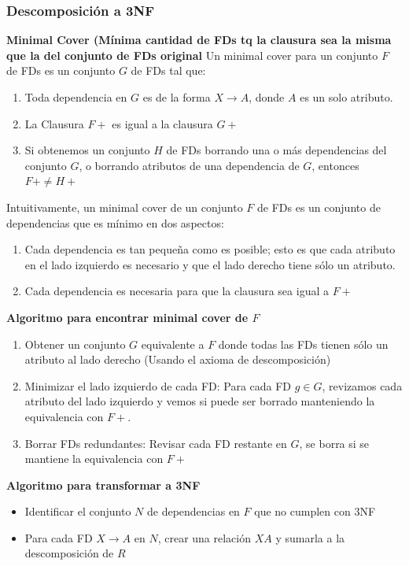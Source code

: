 \documentclass[11pt,letterpaper]{article}
\begin{document}
\subsubsection{Descomposición a 3NF}
\textbf{Minimal Cover (Mínima cantidad de FDs tq la clausura sea la misma que la del conjunto de FDs original}
Un minimal cover para un conjunto $F$ de FDs es un conjunto $G$ de FDs tal que:
\begin{enumerate}
	\item Toda dependencia en $G$ es de la forma $X\rightarrow A$, donde $A$ es un solo atributo.
	\item La Clausura $F+$ es igual a la clausura $G+$
	\item Si obtenemos un conjunto $H$ de FDs borrando una o más dependencias del conjunto $G$, o borrando atributos de una dependencia de $G$, entonces $F+\not = H+$
\end{enumerate}

Intuitivamente, un minimal cover de un conjunto $F$ de FDs es un conjunto de dependencias que es mínimo en dos aspectos:
\begin{enumerate}
	\item Cada dependencia es tan pequeña como es posible; esto es que cada atributo en el lado izquierdo es necesario y que el lado derecho tiene sólo un atributo.
	\item Cada dependencia es necesaria para que la clausura sea igual a $F+$
\end{enumerate}

\textbf{Algoritmo para encontrar minimal cover de $F$}
\begin{enumerate}
	\item Obtener un conjunto $G$ equivalente a $F$ donde todas las FDs tienen sólo un atributo al lado derecho (Usando el axioma de descomposición)
	\item Minimizar el lado izquierdo de cada FD: Para cada FD $g \in G$, revizamos cada atributo del lado izquierdo y vemos si puede ser borrado manteniendo la equivalencia con $F+$.
	\item Borrar FDs redundantes: Revisar cada FD restante en $G$, se borra si se mantiene la equivalencia con $F+$ 
\end{enumerate}

\textbf{Algoritmo para transformar a 3NF}
\begin{itemize}
	\item Identificar el conjunto $N$ de dependencias en $F$ que no cumplen con 3NF 
	\item Para cada FD $X\rightarrow A$ en $N$, crear una relación $XA$ y sumarla a la descomposición de $R$
\end{itemize}
\end{document}
